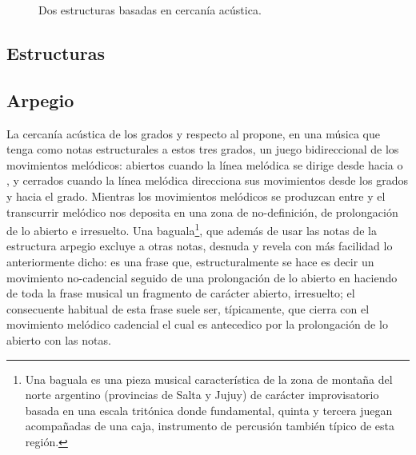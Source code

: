 \documentclass[a4paper,12pt]{article}
\begin{document}
\begin{figure}[ht]
\centering
{}
\caption{Dos estructuras basadas en cercanía acústica.}\label{fig:dos-estructuras}
\end{figure}

\begin{multicols}{2}
\section{Estructuras}\label{sec:estructuras}
  \subsection{Arpegio}\label{subsec:arpegio}
  La cercanía acústica de los grados  y  respecto al  propone, en una música que tenga como notas estructurales a estos tres grados, un juego bidireccional de los movimientos melódicos: abiertos cuando la línea melódica se dirige desde  hacia  o , y cerrados cuando la línea melódica direcciona sus movimientos desde los grados  y  hacia el  grado. Mientras los movimientos melódicos se produzcan entre  y  el transcurrir melódico nos deposita en una zona de no-definición, de prolongación de lo abierto e irresuelto. Una baguala\footnote{Una baguala es una pieza musical característica de la zona de montaña del norte argentino (provincias de Salta y Jujuy) de carácter improvisatorio basada en una escala tritónica donde fundamental, quinta y tercera juegan acompañadas de una caja, instrumento de percusión también típico de esta región.}, que además de usar las notas de la estructura arpegio excluye a otras notas, desnuda y revela con más facilidad lo anteriormente dicho:  es una frase que, estructuralmente se hace  es decir un movimiento no-cadencial  seguido de una prolongación de lo abierto en  haciendo de toda la frase musical un fragmento de carácter abierto, irresuelto; el consecuente habitual de esta frase suele ser, típicamente,  que cierra con el movimiento melódico cadencial  el cual es antecedico por la prolongación de lo abierto con las notas\hbox{.}


\end{multicols}
\end{document}
